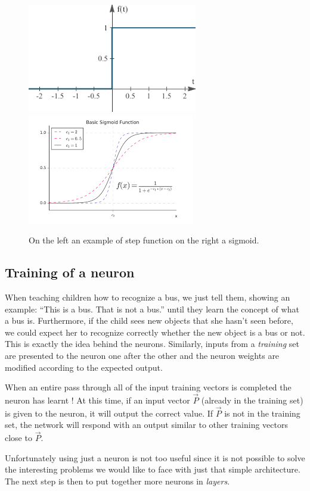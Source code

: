 \begin{figure}
\centering
\includegraphics[width=0.4\linewidth]{figures/step_function.png}\quad
\includegraphics[width=0.4\linewidth]{figures/sigmoid.png}
\caption{On the left an example of step function on the right a sigmoid.}
\end{figure}

\subsection{Training of a neuron}\label{training-of-a-neuron}

When teaching children how to recognize a bus, we just tell them,
showing an example: ``This is a bus. That is not a bus.'' until they
learn the concept of what a bus is. Furthermore, if the child sees new
objects that she hasn't seen before, we could expect her to recognize
correctly whether the new object is a bus or not. This is exactly the
idea behind the neurons. Similarly, inputs from a \emph{training} set
are presented to the neuron one after the other and the neuron weights
are modified according to the expected output.

When an entire pass through all of the input training vectors is
completed the neuron has learnt ! At this time, if an input vector
\(\vec{P}\) (already in the training set) is given to the neuron, it
will output the correct value. If \(\vec{P}\) is not in the training
set, the network will respond with an output similar to other training
vectors close to \(\vec{P}\).

Unfortunately using just a neuron is not too useful since it is not
possible to solve the interesting problems we would like to face with
just that simple architecture. The next step is then to put together
more neurons in \emph{layers}.

